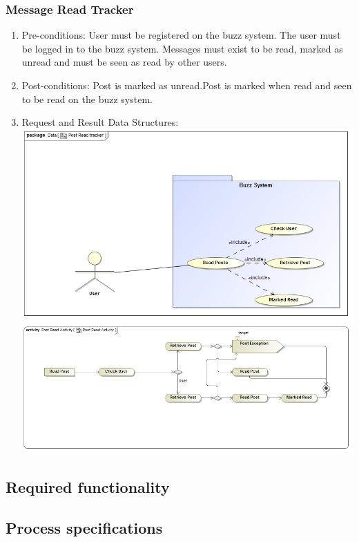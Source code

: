 \documentclass[12pt, oneside]{book}
\begin{document}
\subsubsection{Message Read Tracker}
\begin{enumerate}
 \item Pre-conditions:  User must be registered on the buzz system. The user must be logged in to the buzz system. Messages must exist to be read, marked as unread and must be seen as read by other users.
 \\
 \item Post-conditions: Post is marked as unread.Post is marked when read and seen to be read on the buzz system.
   \\
 \item Request and Result Data Structures:\\
   \includegraphics[scale=0.4]{PostReadTracker}\\
 \includegraphics[scale=0.4]{PostReadActivity} 
\end{enumerate}


\subsection{Required functionality}
\subsection{Process specifications}
\end{document}

